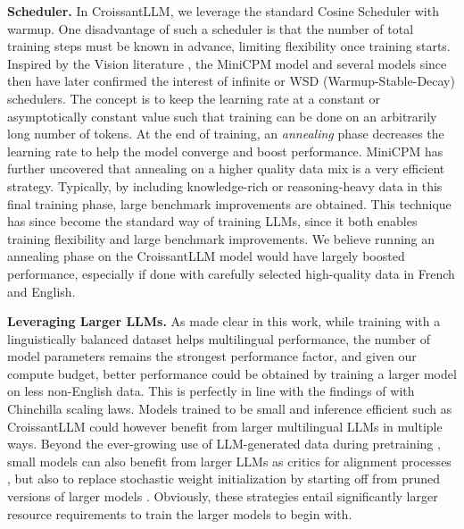 \noindent\textbf{Scheduler.} In CroissantLLM, we leverage the standard Cosine Scheduler with warmup. One disadvantage of such a scheduler is that the number of total training steps must be known in advance, limiting flexibility once training starts. Inspired by the Vision literature , the MiniCPM model  and several models since then have later confirmed the interest of infinite or WSD (Warmup-Stable-Decay) schedulers. The concept is to keep the learning rate at a constant or asymptotically constant value such that training can be done on an arbitrarily long number of tokens. At the end of training, an \textit{annealing} phase decreases the learning rate to help the model converge and boost performance. MiniCPM has further uncovered that annealing on a higher quality data mix is a very efficient strategy. Typically, by including knowledge-rich or reasoning-heavy data in this final training phase, large benchmark improvements are obtained. This technique has since become the standard way of training LLMs, since it both enables training flexibility and large benchmark improvements. We believe running an annealing phase on the CroissantLLM model would have largely boosted performance, especially if done with carefully selected high-quality data in French and English.

\noindent\textbf{Leveraging Larger LLMs.} As made clear in this work, while training with a linguistically balanced dataset helps multilingual performance, the number of model parameters remains the strongest performance factor, and given our compute budget, better performance could be obtained by training a larger model on less non-English data. This is perfectly in line with the findings of  with Chinchilla scaling laws. Models trained to be small and inference efficient such as CroissantLLM could however benefit from larger multilingual LLMs in multiple ways. Beyond the ever-growing use of LLM-generated data during pretraining , small models can also benefit from larger LLMs as critics for alignment processes , but also to replace stochastic weight initialization by starting off from pruned versions of larger models . Obviously, these strategies entail significantly larger resource requirements to train the larger models to begin with.


